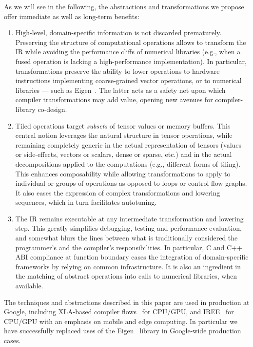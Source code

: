 As we will see in the following, the abstractions and transformations we propose offer immediate as well as long-term benefits:
\begin{enumerate}
\item High-level, domain-specific information is not discarded prematurely.
Preserving the structure of computational operations allows to transform the IR while avoiding the performance cliffs of numerical libraries (e.g., when a fused operation is lacking a high-performance implementation).
In particular, transformations preserve the ability to lower operations to hardware instructions implementing coarse-grained vector operations, or to numerical libraries --- such as Eigen~\cite{eigen}.
The latter acts as a safety net upon which compiler transformations may add value, opening new avenues for compiler-library co-design.
\item Tiled operations target \emph{subsets} of tensor values or memory buffers. This central notion leverages the natural structure in tensor operations, while remaining completely generic in the actual representation of tensors (values or side-effects, vectors or scalars, dense or sparse, etc.) and in the actual decompositions applied to the computations (e.g., different forms of tiling). This enhances composability while allowing transformations to apply to individual or groups of operations as opposed to loops or control-flow graphs. It also eases the expression of complex transformations and lowering sequences, which in turn facilitates autotuning.
\item The IR remains executable at any intermediate transformation and lowering step. This greatly simplifies debugging, testing and performance evaluation, and somewhat blurs the lines between what is traditionally considered the programmer's and the compiler's responsibilities.
In particular, C and C++ ABI compliance at function boundary eases the integration of domain-specific frameworks by relying on common infrastructure.
It is also an ingredient in the matching of abstract operations into calls to numerical libraries, when available.
\end{enumerate}

The techniques and abstractions described in this paper are used in production at Google, including XLA-based compiler flows~\cite{XLA} for CPU/GPU, and IREE~\cite{iree} for CPU/GPU with an emphasis on mobile and edge computing.
In particular we have successfully replaced uses of the Eigen~\cite{eigen} library in Google-wide production cases.
